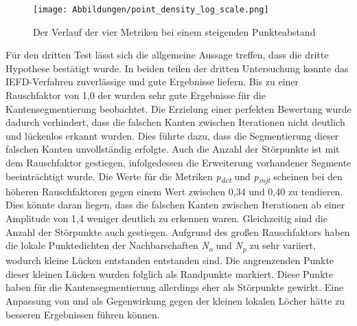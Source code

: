 \begin{figure}[t]
	\texttt{[image: Abbildungen/point\_density\_log\_scale.png]}
	\centering
	\caption[Verhältnis zwischen Genauigkeit und Punkteabstand]{Der Verlauf der vier Metriken bei einem steigenden Punkteabstand}
	\label{fig: point_density_trend}
\end{figure}

Für den dritten Test lässt sich die allgemeine Aussage treffen, dass die dritte Hypothese bestätigt wurde. In beiden teilen der dritten Untersuchung konnte das IEFD-Verfahren zuverlässige und gute Ergebnisse liefern. Bis zu einer Rauschfaktor von 1,0 der wurden sehr gute Ergebnisse für die Kantensegmentierung beobachtet. Die Erzielung einer perfekten Bewertung wurde dadurch verhindert, dass die falschen Kanten zwischen Iterationen nicht deutlich und lückenlos erkannt wurden. Dies führte dazu, dass die Segmentierung dieser falschen Kanten unvollständig erfolgte. Auch die Anzahl der Störpunkte ist mit dem Rauschfaktor gestiegen, infolgedessen die Erweiterung vorhandener Segmente beeinträchtigt wurde. Die Werte für die Metriken \textit{p\textsubscript{dct}} und \textit{p\textsubscript{mjt}} scheinen bei den höheren Rauschfaktoren gegen einem Wert zwischen 0,34 und 0,40 zu tendieren. Dies könnte daran liegen, dass die falschen Kanten zwischen Iterationen ab einer Amplitude von 1,4 weniger deutlich zu erkennen waren. Gleichzeitig sind die Anzahl der Störpunkte auch gestiegen. Aufgrund des großen Rauschfaktors haben die lokale Punktedichten der Nachbarschaften \textit{N\textsubscript{o}} und \textit{N\textsubscript{p}} zu sehr variiert, wodurch kleine Lücken entstanden entstanden sind. Die angrenzenden Punkte dieser kleinen Lücken wurden folglich als Randpunkte markiert. Diese Punkte haben für die Kantensegmentierung allerdings eher als Störpunkte gewirkt. Eine Anpassung von \distthresha und \distthreshb als Gegenwirkung gegen der kleinen lokalen Löcher hätte zu besseren Ergebnissen führen können. 

